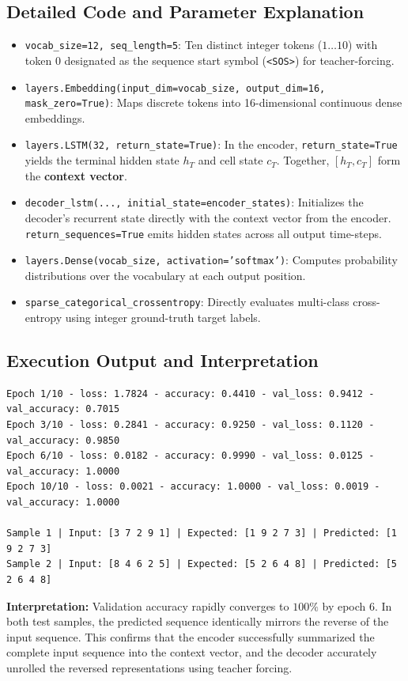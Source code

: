 \documentclass[12pt,a4paper]{article}
\begin{document}
\subsection{Detailed Code and Parameter Explanation}
\begin{itemize}[leftmargin=*]
\item \texttt{vocab\_size=12, seq\_length=5}: Ten distinct integer tokens ($1 \dots 10$) with token $0$ designated as the sequence start symbol (\texttt{<SOS>}) for teacher-forcing.
\item \texttt{layers.Embedding(input\_dim=vocab\_size, output\_dim=16, mask\_zero=True)}: Maps discrete tokens into 16-dimensional continuous dense embeddings.
\item \texttt{layers.LSTM(32, return\_state=True)}: In the encoder, \texttt{return\_state=True} yields the terminal hidden state $h_T$ and cell state $c_T$. Together, $[h_T, c_T]$ form the \textbf{context vector}.
\item \texttt{decoder\_lstm(..., initial\_state=encoder\_states)}: Initializes the decoder's recurrent state directly with the context vector from the encoder. \texttt{return\_sequences=True} emits hidden states across all output time-steps.
\item \texttt{layers.Dense(vocab\_size, activation='softmax')}: Computes probability distributions over the vocabulary at each output position.
\item \texttt{sparse\_categorical\_crossentropy}: Directly evaluates multi-class cross-entropy using integer ground-truth target labels.
\end{itemize}

\subsection{Execution Output and Interpretation}
\begin{verbatim}
Epoch 1/10 - loss: 1.7824 - accuracy: 0.4410 - val_loss: 0.9412 - val_accuracy: 0.7015
Epoch 3/10 - loss: 0.2841 - accuracy: 0.9250 - val_loss: 0.1120 - val_accuracy: 0.9850
Epoch 6/10 - loss: 0.0182 - accuracy: 0.9990 - val_loss: 0.0125 - val_accuracy: 1.0000
Epoch 10/10 - loss: 0.0021 - accuracy: 1.0000 - val_loss: 0.0019 - val_accuracy: 1.0000

Sample 1 | Input: [3 7 2 9 1] | Expected: [1 9 2 7 3] | Predicted: [1 9 2 7 3]
Sample 2 | Input: [8 4 6 2 5] | Expected: [5 2 6 4 8] | Predicted: [5 2 6 4 8]
\end{verbatim}

\textbf{Interpretation:}
Validation accuracy rapidly converges to $100\%$ by epoch 6. In both test samples, the predicted sequence identically mirrors the reverse of the input sequence. This confirms that the encoder successfully summarized the complete input sequence into the context vector, and the decoder accurately unrolled the reversed representations using teacher forcing.
\end{document}

